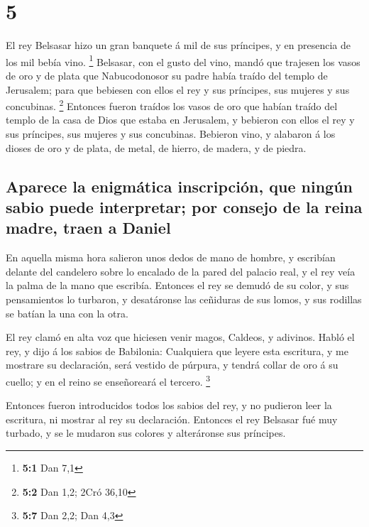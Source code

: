 \hypertarget{section-4}{%
\section{5}\label{section-4}}

 El rey Belsasar hizo un gran banquete á mil de sus
príncipes, y en presencia de los mil bebía vino. \footnote{\textbf{5:1}
  Dan 7,1}  Belsasar, con el gusto del vino, mandó que
trajesen los vasos de oro y de plata que Nabucodonosor su padre había
traído del templo de Jerusalem; para que bebiesen con ellos el rey y sus
príncipes, sus mujeres y sus concubinas. \footnote{\textbf{5:2} Dan 1,2;
  2Cró 36,10}  Entonces fueron traídos los vasos de oro
que habían traído del templo de la casa de Dios que estaba en Jerusalem,
y bebieron con ellos el rey y sus príncipes, sus mujeres y sus
concubinas.  Bebieron vino, y alabaron á los dioses de oro
y de plata, de metal, de hierro, de madera, y de piedra.

\hypertarget{aparece-la-enigmuxe1tica-inscripciuxf3n-que-ninguxfan-sabio-puede-interpretar-por-consejo-de-la-reina-madre-traen-a-daniel}{%
\subsection{Aparece la enigmática inscripción, que ningún sabio puede
interpretar; por consejo de la reina madre, traen a
Daniel}\label{aparece-la-enigmuxe1tica-inscripciuxf3n-que-ninguxfan-sabio-puede-interpretar-por-consejo-de-la-reina-madre-traen-a-daniel}}

 En aquella misma hora salieron unos dedos de mano de
hombre, y escribían delante del candelero sobre lo encalado de la pared
del palacio real, y el rey veía la palma de la mano que escribía.
 Entonces el rey se demudó de su color, y sus pensamientos
lo turbaron, y desatáronse las ceñiduras de sus lomos, y sus rodillas se
batían la una con la otra.

 El rey clamó en alta voz que hiciesen venir magos,
Caldeos, y adivinos. Habló el rey, y dijo á los sabios de Babilonia:
Cualquiera que leyere esta escritura, y me mostrare su declaración, será
vestido de púrpura, y tendrá collar de oro á su cuello; y en el reino se
enseñoreará el tercero. \footnote{\textbf{5:7} Dan 2,2; Dan 4,3}

 Entonces fueron introducidos todos los sabios del rey, y
no pudieron leer la escritura, ni mostrar al rey su declaración.
 Entonces el rey Belsasar fué muy turbado, y se le mudaron
sus colores y alteráronse sus príncipes.

